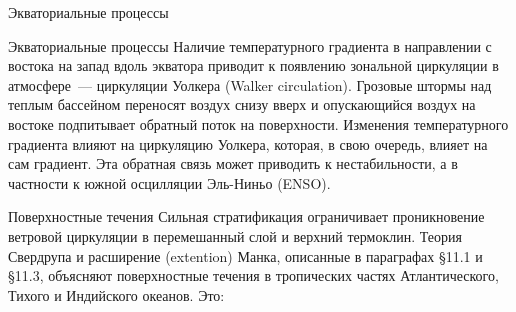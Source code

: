 \begin{chapter}{Экваториальные процессы}
\begin{section}{Экваториальные процессы}
Наличие температурного градиента в направлении с востока на запад
вдоль экватора приводит к появлению зональной циркуляции в
атмосфере~--- циркуляции Уолкера (Walker circulation). Грозовые штормы
над теплым бассейном переносят воздух снизу вверх и опускающийся
воздух на востоке подпитывает обратный поток на поверхности. Изменения
температурного градиента влияют на циркуляцию Уолкера, которая, в свою
очередь, влияет на сам градиент. Эта обратная связь может приводить к
нестабильности, а в частности к южной осцилляции Эль-Ниньо (ENSO).
%

\begin{paragraph}{Поверхностные течения}
Сильная стратификация ограничивает проникновение ветровой циркуляции в
перемешанный слой и верхний термоклин. Теория Свердрупа и расширение
(extention) Манка, описанные в параграфах \S11.1 и \S11.3, объясняют
поверхностные течения в тропических частях Атлантического, Тихого и
Индийского океанов. Это:
%


\end{paragraph}
\end{section}
\end{chapter}
